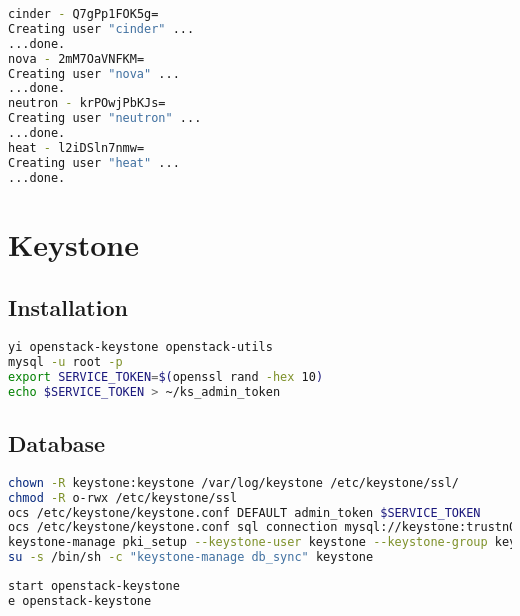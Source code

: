 \documentclass[11pt,letterpaper,oneside]{book}
\begin{document}
\begin{lstlisting}[caption={Result from user account creation},language=bash]
cinder - Q7gPp1FOK5g=
Creating user "cinder" ...
...done.
nova - 2mM7OaVNFKM=
Creating user "nova" ...
...done.
neutron - krPOwjPbKJs=
Creating user "neutron" ...
...done.
heat - l2iDSln7nmw=
Creating user "heat" ...
...done.
\end{lstlisting}

\chapter{Keystone}

\section{Installation}
\begin{lstlisting}[caption={Install Keystone packages},language=bash]
yi openstack-keystone openstack-utils 
mysql -u root -p
export SERVICE_TOKEN=$(openssl rand -hex 10)
echo $SERVICE_TOKEN > ~/ks_admin_token
\end{lstlisting}

\section{Database}

\begin{lstlisting}[caption={Keystone configuration},language=bash]
chown -R keystone:keystone /var/log/keystone /etc/keystone/ssl/
chmod -R o-rwx /etc/keystone/ssl
ocs /etc/keystone/keystone.conf DEFAULT admin_token $SERVICE_TOKEN
ocs /etc/keystone/keystone.conf sql connection mysql://keystone:trustn01@10.53.252.61/keystone
keystone-manage pki_setup --keystone-user keystone --keystone-group keystone 
su -s /bin/sh -c "keystone-manage db_sync" keystone
\end{lstlisting}

\begin{lstlisting}[caption={Start and enable Keystone},language=bash]
start openstack-keystone
e openstack-keystone
\end{lstlisting}
\end{document}
